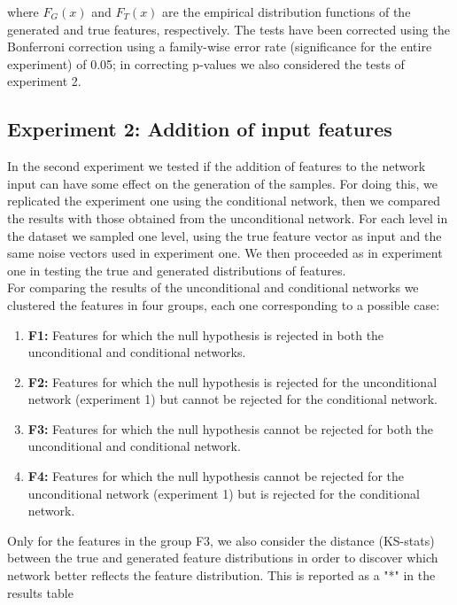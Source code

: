 where $F_{G}(x)$ and $F_{T}(x)$ are the empirical distribution functions of the generated and true features, respectively. The tests have been corrected using the Bonferroni correction using a family-wise error rate (significance for the entire experiment) of 0.05; in correcting p-values we also considered the tests of experiment 2.   %

\subsection{Experiment 2: Addition of input features}
\label{sec:experiment-2}
In the second experiment we tested if the addition of features to the network input can have some effect on the generation of the samples. For doing this, we replicated the experiment one using the conditional network, then we compared the results with those obtained from the unconditional network. For each level in the dataset we sampled one level, using the true feature vector as input and
the same noise vectors used in experiment one. We then proceeded as in experiment one in testing the true and generated distributions of features. \\
For comparing the results of the unconditional and conditional networks we clustered the features in four groups, each one corresponding to a possible case: \\
\begin{enumerate}
	\item \textbf{F1:} Features for which the null hypothesis is rejected in both the unconditional and conditional networks. 
	\item \textbf{F2:} Features for which the null hypothesis is rejected for the unconditional network (experiment 1) but cannot be rejected for the conditional network. 
	\item \textbf{F3:} Features for which the null hypothesis cannot be rejected for both the unconditional  and conditional network.
	\item \textbf{F4:} Features for which the null hypothesis cannot be rejected for the unconditional network (experiment 1) but is rejected for the conditional network.
\end{enumerate}

Only for the features in the group F3, we also consider the distance (KS-stats) between the true and generated feature distributions in order to discover which network better reflects the feature distribution. This is reported as a "*" in the results table %


